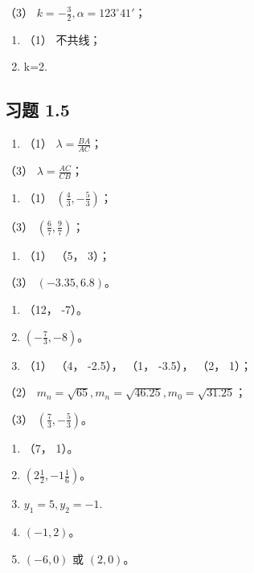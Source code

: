 （3） \(k = -\frac{3}{2}, \alpha = 123^{\circ}41'\)；

\begin{enumerate}
\def\labelenumi{\arabic{enumi}.}
\setcounter{enumi}{8}
\item
  （1） 不共线；
\item
  k=2.
\end{enumerate}

\subsection{习题 1.5}\label{ux4e60ux9898-1.5}

\begin{enumerate}
\def\labelenumi{\arabic{enumi}.}
\tightlist
\item
  （1） \(\lambda = \frac{BA}{AC}\)；
\end{enumerate}

（3） \(\lambda = \frac{AC}{CB}\)；

\begin{enumerate}
\def\labelenumi{\arabic{enumi}.}
\setcounter{enumi}{1}
\tightlist
\item
  （1） \(\left(\frac{4}{3}, -\frac{5}{3}\right)\)；
\end{enumerate}

（3） \(\left(\frac{6}{7}, \frac{9}{7}\right)\)；

\begin{enumerate}
\def\labelenumi{\arabic{enumi}.}
\setcounter{enumi}{2}
\tightlist
\item
  （1） （5， 3）；
\end{enumerate}

（3） \((-3.35, 6.8)\)。

\begin{enumerate}
\def\labelenumi{\arabic{enumi}.}
\setcounter{enumi}{3}
\item
  （12， -7）。
\item
  \(\left(-\frac{7}{3},-8\right)\)。
\item
  （1） （4， -2.5）， （1， -3.5）， （2， 1）；
\end{enumerate}

（2）
\(m_{n} = \sqrt{65}, m_{n} = \sqrt{46.25}, m_{0} = \sqrt{31.25}\)；

（3） \(\left(\frac{7}{3}, -\frac{5}{3}\right)\)。

\begin{enumerate}
\def\labelenumi{\arabic{enumi}.}
\setcounter{enumi}{8}
\item
  （7， 1）。
\item
  \(\left(2\frac{1}{2}, -1\frac{1}{6}\right)\)。
\item
  \(y_{1} = 5, y_{2} = -1.\)
\item
  \((-1, 2)\)。
\item
  \((-6, 0)\) 或 \((2, 0)\)。
\end{enumerate}

